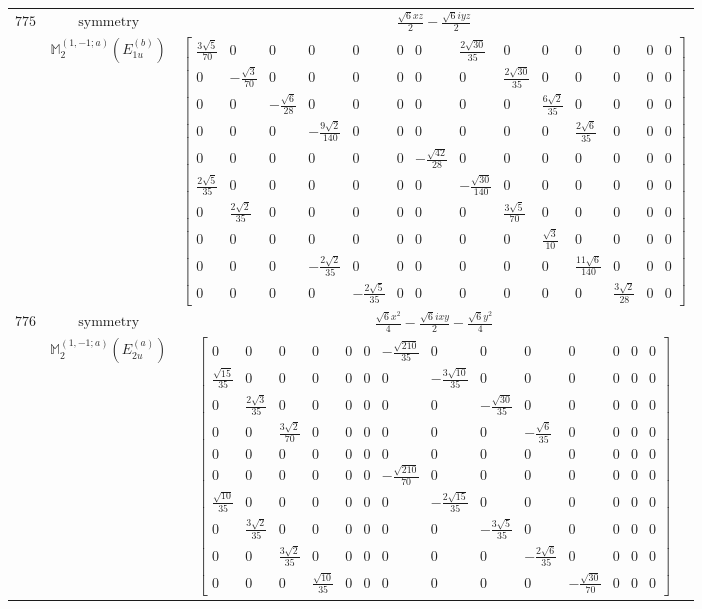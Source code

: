 \documentclass[fleqn,8pt,landscape]{jsarticle}
\begin{document}
\begin{longtable}{ccc}
$ 775 $ & $ \text{symmetry} $ & $ \frac{\sqrt{6} x z}{2} - \frac{\sqrt{6} i y z}{2} $ \\
$  $ & $ \mathbb{M}_{2}^{(1,-1;a)}(E_{1u}^{(b)}) $ & $ \begin{bmatrix} \frac{3 \sqrt{5}}{70} & 0 & 0 & 0 & 0 & 0 & 0 & \frac{2 \sqrt{30}}{35} & 0 & 0 & 0 & 0 & 0 & 0 \\ 0 & - \frac{\sqrt{3}}{70} & 0 & 0 & 0 & 0 & 0 & 0 & \frac{2 \sqrt{30}}{35} & 0 & 0 & 0 & 0 & 0 \\ 0 & 0 & - \frac{\sqrt{6}}{28} & 0 & 0 & 0 & 0 & 0 & 0 & \frac{6 \sqrt{2}}{35} & 0 & 0 & 0 & 0 \\ 0 & 0 & 0 & - \frac{9 \sqrt{2}}{140} & 0 & 0 & 0 & 0 & 0 & 0 & \frac{2 \sqrt{6}}{35} & 0 & 0 & 0 \\ 0 & 0 & 0 & 0 & 0 & 0 & - \frac{\sqrt{42}}{28} & 0 & 0 & 0 & 0 & 0 & 0 & 0 \\ \frac{2 \sqrt{5}}{35} & 0 & 0 & 0 & 0 & 0 & 0 & - \frac{\sqrt{30}}{140} & 0 & 0 & 0 & 0 & 0 & 0 \\ 0 & \frac{2 \sqrt{2}}{35} & 0 & 0 & 0 & 0 & 0 & 0 & \frac{3 \sqrt{5}}{70} & 0 & 0 & 0 & 0 & 0 \\ 0 & 0 & 0 & 0 & 0 & 0 & 0 & 0 & 0 & \frac{\sqrt{3}}{10} & 0 & 0 & 0 & 0 \\ 0 & 0 & 0 & - \frac{2 \sqrt{2}}{35} & 0 & 0 & 0 & 0 & 0 & 0 & \frac{11 \sqrt{6}}{140} & 0 & 0 & 0 \\ 0 & 0 & 0 & 0 & - \frac{2 \sqrt{5}}{35} & 0 & 0 & 0 & 0 & 0 & 0 & \frac{3 \sqrt{2}}{28} & 0 & 0 \end{bmatrix} $ \\ \hline
$ 776 $ & $ \text{symmetry} $ & $ \frac{\sqrt{6} x^{2}}{4} - \frac{\sqrt{6} i x y}{2} - \frac{\sqrt{6} y^{2}}{4} $ \\
$  $ & $ \mathbb{M}_{2}^{(1,-1;a)}(E_{2u}^{(a)}) $ & $ \begin{bmatrix} 0 & 0 & 0 & 0 & 0 & 0 & - \frac{\sqrt{210}}{35} & 0 & 0 & 0 & 0 & 0 & 0 & 0 \\ \frac{\sqrt{15}}{35} & 0 & 0 & 0 & 0 & 0 & 0 & - \frac{3 \sqrt{10}}{35} & 0 & 0 & 0 & 0 & 0 & 0 \\ 0 & \frac{2 \sqrt{3}}{35} & 0 & 0 & 0 & 0 & 0 & 0 & - \frac{\sqrt{30}}{35} & 0 & 0 & 0 & 0 & 0 \\ 0 & 0 & \frac{3 \sqrt{2}}{70} & 0 & 0 & 0 & 0 & 0 & 0 & - \frac{\sqrt{6}}{35} & 0 & 0 & 0 & 0 \\ 0 & 0 & 0 & 0 & 0 & 0 & 0 & 0 & 0 & 0 & 0 & 0 & 0 & 0 \\ 0 & 0 & 0 & 0 & 0 & 0 & - \frac{\sqrt{210}}{70} & 0 & 0 & 0 & 0 & 0 & 0 & 0 \\ \frac{\sqrt{10}}{35} & 0 & 0 & 0 & 0 & 0 & 0 & - \frac{2 \sqrt{15}}{35} & 0 & 0 & 0 & 0 & 0 & 0 \\ 0 & \frac{3 \sqrt{2}}{35} & 0 & 0 & 0 & 0 & 0 & 0 & - \frac{3 \sqrt{5}}{35} & 0 & 0 & 0 & 0 & 0 \\ 0 & 0 & \frac{3 \sqrt{2}}{35} & 0 & 0 & 0 & 0 & 0 & 0 & - \frac{2 \sqrt{6}}{35} & 0 & 0 & 0 & 0 \\ 0 & 0 & 0 & \frac{\sqrt{10}}{35} & 0 & 0 & 0 & 0 & 0 & 0 & - \frac{\sqrt{30}}{70} & 0 & 0 & 0 \end{bmatrix} $ \\ \hline

\end{longtable}
\end{document}
